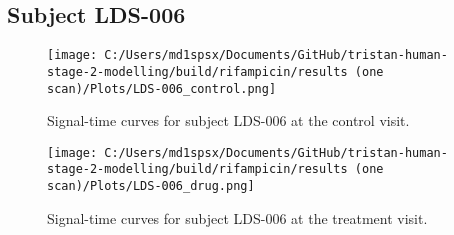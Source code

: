 \documentclass{epflreport}%
\begin{document}
\subsection{Subject LDS{-}006}%
\label{subsec:SubjectLDS{-}006}%

%


\begin{figure}[h!]%
\centering%
\texttt{[image: C:/Users/md1spsx/Documents/GitHub/tristan-human-stage-2-modelling/build/rifampicin/results (one scan)/Plots/LDS-006\_control.png]}%
\caption{Signal{-}time curves for subject LDS{-}006 at the control visit.}%
\end{figure}

%


\begin{figure}[h!]%
\centering%
\texttt{[image: C:/Users/md1spsx/Documents/GitHub/tristan-human-stage-2-modelling/build/rifampicin/results (one scan)/Plots/LDS-006\_drug.png]}%
\caption{Signal{-}time curves for subject LDS{-}006 at the treatment visit.}%
\end{figure}
\end{document}
